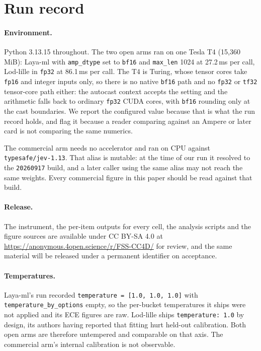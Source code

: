 \documentclass[11pt]{article}
\begin{document}
\section{Run record}
\label{app:repro}

\paragraph{Environment.} Python 3.13.15 throughout. The two open arms ran on one
Tesla T4 (15{,}360\,MiB): Laya-ml with \texttt{amp\_dtype} set to \texttt{bf16}
and \texttt{max\_len} 1024 at 27.2\,ms per call, Lod-lille in \texttt{fp32} at
86.1\,ms per call. The T4 is Turing, whose tensor cores take \texttt{fp16} and
integer inputs only, so there is no native \texttt{bf16} path and no
\texttt{fp32} or \texttt{tf32} tensor-core path either: the autocast context
accepts the setting and the arithmetic falls back to ordinary \texttt{fp32} CUDA
cores, with \texttt{bf16} rounding only at the cast boundaries. We report the configured value because that is what the run record
holds, and flag it because a reader comparing against an Ampere or later card is
not comparing the same numerics.

The commercial arm needs no accelerator and ran on CPU against
\texttt{typesafe/jev-1.13}. That alias is mutable: at the time of our run it
resolved to the \texttt{20260917} build, and a later caller using the same alias
may not reach the same weights. Every commercial figure in this paper should be
read against that build.

\paragraph{Release.} The instrument, the per-item outputs for every cell, the
analysis scripts and the figure sources are available under CC BY-SA 4.0 at
\url{https://anonymous.4open.science/r/FSS-CC4D/} for review, and the same material
will be released under a permanent identifier on acceptance.

\paragraph{Temperatures.} Laya-ml's run recorded
\texttt{temperature = [1.0, 1.0, 1.0]} with \texttt{temperature\_by\_options}
empty, so the per-bucket temperatures it ships were not applied and its ECE
figures are raw. Lod-lille ships \texttt{temperature: 1.0} by design, its
authors having reported that fitting hurt held-out calibration. Both open arms
are therefore untempered and comparable on that axis. The commercial arm's
internal calibration is not observable.
\end{document}
